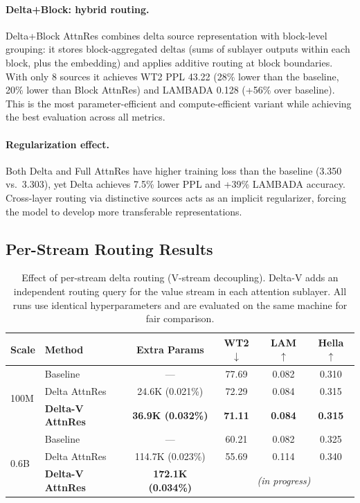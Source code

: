 \documentclass{article}
\begin{document}
\paragraph{Delta+Block: hybrid routing.} Delta+Block AttnRes combines delta source representation with block-level grouping: it stores block-aggregated deltas (sums of sublayer outputs within each block, plus the embedding) and applies additive routing at block boundaries. With only 8 sources it achieves WT2 PPL 43.22 (28\% lower than the baseline, 20\% lower than Block AttnRes) and LAMBADA 0.128 (+56\% over baseline). This is the most parameter-efficient and compute-efficient variant while achieving the best evaluation across all metrics.

\paragraph{Regularization effect.} Both Delta and Full AttnRes have higher training loss than the baseline (3.350 vs.\ 3.303), yet Delta achieves 7.5\% lower PPL and +39\% LAMBADA accuracy. Cross-layer routing via distinctive sources acts as an implicit regularizer, forcing the model to develop more transferable representations.

\subsection{Per-Stream Routing Results}
\label{sec:per_stream_results}

\begin{table}[h]
\centering
\caption{Effect of per-stream delta routing (V-stream decoupling). Delta-V adds an independent routing query for the value stream in each attention sublayer. All runs use identical hyperparameters and are evaluated on the same machine for fair comparison.}
\label{tab:delta_v}
\begin{tabular}{llcccc}
\toprule
\textbf{Scale} & \textbf{Method} & \textbf{Extra Params} & \textbf{WT2 $\downarrow$} & \textbf{LAM $\uparrow$} & \textbf{Hella $\uparrow$} \\
\midrule
\multirow{3}{*}{100M} & Baseline & --- & 77.69 & 0.082 & 0.310 \\
 & Delta AttnRes & 24.6K (0.021\%) & 72.29 & 0.084 & 0.315 \\
 & \textbf{Delta-V AttnRes} & \textbf{36.9K (0.032\%)} & \textbf{71.11} & \textbf{0.084} & \textbf{0.315} \\
\midrule
\multirow{3}{*}{0.6B} & Baseline & --- & 60.21 & 0.082 & 0.325 \\
 & Delta AttnRes & 114.7K (0.023\%) & 55.69 & 0.114 & 0.340 \\
 & \textbf{Delta-V AttnRes} & \textbf{172.1K (0.034\%)} & \multicolumn{3}{c}{\textit{(in progress)}} \\
\bottomrule
\end{tabular}
\end{table}
\end{document}
